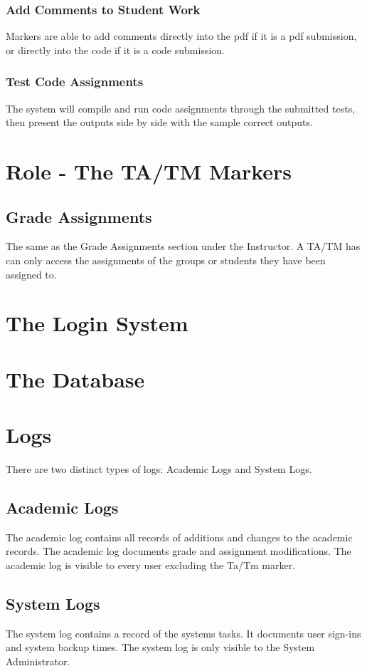 \documentclass{article}
\begin{document}
\subsubsection{Add Comments to Student Work}
Markers are able to add comments directly into the pdf if it is a pdf submission,
or directly into the code if it is a code submission.
\subsubsection{Test Code Assignments}
The system will compile and run code assignments through the submitted tests,
then present the outputs side by side with the sample correct outputs.

\section{Role - The TA/TM Markers}
\subsection{Grade Assignments}
The same as the Grade Assignments section under the Instructor.
A TA/TM has can only access the assignments of the groups or students they
have been assigned to.

\section{The Login System}

\section{The Database}

\section{Logs}
There are two distinct types of logs: Academic Logs and System Logs.
\subsection{Academic Logs}
The academic log contains all records of additions and changes to the academic records.
The academic log documents grade and assignment modifications.  The academic log
is visible to every user excluding the Ta/Tm marker.
\subsection{System Logs}
The system log contains a record of the systems tasks.  It documents user sign-ins
and system backup times. The system log is only visible to the System Administrator.
\end{document}
